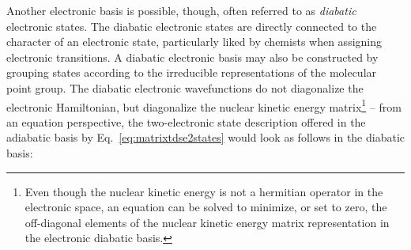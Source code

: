 \documentclass[9pt,bestpractices,pubversion]{livecoms}
\begin{document}
Another electronic basis is possible, though, often referred to as \textit{diabatic} electronic states. The diabatic electronic states are directly connected to the character of an electronic state, particularly liked by chemists when assigning electronic transitions. A diabatic electronic basis may also be constructed by grouping states according to the irreducible representations of the molecular point group. The diabatic electronic wavefunctions do not diagonalize the electronic Hamiltonian, but diagonalize the nuclear kinetic energy matrix\footnote{Even though the nuclear kinetic energy is not a hermitian operator in the electronic space, an equation can be solved to minimize, or set to zero, the off-diagonal elements of the nuclear kinetic energy matrix representation in the electronic diabatic basis.} -- from an equation perspective, the two-electronic state description offered in the adiabatic basis by Eq.~\eqref{eq:matrixtdse2states} would look as follows in the diabatic basis:
\end{document}
